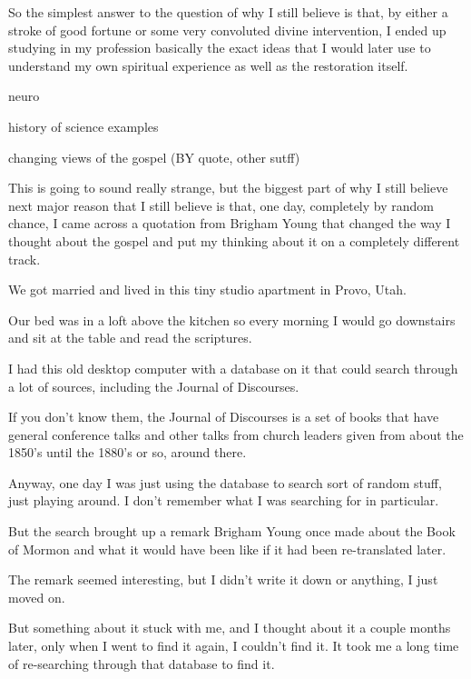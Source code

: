 \begin{compactitem}
			\item So the simplest answer to the question of why I still believe is that, by either a stroke of good fortune or some very convoluted divine intervention, I ended up studying in my profession basically the exact ideas that I would later use to understand my own spiritual experience as well as the restoration itself.
			
			\item neuro
			
			\item history of science
				examples
				
			\item changing views of the gospel (BY quote, other sutff)
				
			\item This is going to sound really strange, but the biggest part of why I still believe next major reason that I still believe is that, one day, completely by random chance, I came across a quotation from Brigham Young that changed the way I thought about the gospel and put my thinking about it on a completely different track.
				\begin{compactitem}
					\item We got married and lived in this tiny studio apartment in Provo, Utah.
					\item Our bed was in a loft above the kitchen so every morning I would go downstairs and sit at the table and read the scriptures.
					\item I had this old desktop computer with a database on it that could search through a lot of sources, including the Journal of Discourses.
					\item If you don't know them, the Journal of Discourses is a set of books that have general conference talks and other talks from church leaders given from about the 1850's until the 1880's or so, around there.
					\item Anyway, one day I was just using the database to search sort of random stuff, just playing around. I don't remember what I was searching for in particular.
					\item But the search brought up a remark Brigham Young once made about the Book of Mormon and what it would have been like if it had been re-translated later.
					\item The remark seemed interesting, but I didn't write it down or anything, I just moved on.
					\item But something about it stuck with me, and I thought about it a couple months later, only when I went to find it again, I couldn't find it. It took me a long time of re-searching through that database to find it.

\end{compactitem}
\end{compactitem}
